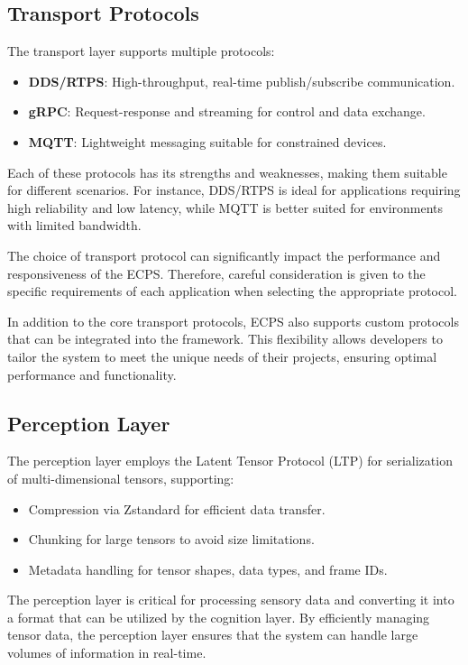 \documentclass[12pt]{article}
\begin{document}
\subsection{Transport Protocols}
The transport layer supports multiple protocols:
\begin{itemize}
  \item \textbf{DDS/RTPS}: High-throughput, real-time publish/subscribe communication.
  \item \textbf{gRPC}: Request-response and streaming for control and data exchange.
  \item \textbf{MQTT}: Lightweight messaging suitable for constrained devices.
\end{itemize}

Each of these protocols has its strengths and weaknesses, making them suitable for different scenarios. For instance, DDS/RTPS is ideal for applications requiring high reliability and low latency, while MQTT is better suited for environments with limited bandwidth.

The choice of transport protocol can significantly impact the performance and responsiveness of the ECPS. Therefore, careful consideration is given to the specific requirements of each application when selecting the appropriate protocol.

In addition to the core transport protocols, ECPS also supports custom protocols that can be integrated into the framework. This flexibility allows developers to tailor the system to meet the unique needs of their projects, ensuring optimal performance and functionality.

\subsection{Perception Layer}
The perception layer employs the Latent Tensor Protocol (LTP) for serialization of multi-dimensional tensors, supporting:
\begin{itemize}
  \item Compression via Zstandard for efficient data transfer.
  \item Chunking for large tensors to avoid size limitations.
  \item Metadata handling for tensor shapes, data types, and frame IDs.
\end{itemize}

The perception layer is critical for processing sensory data and converting it into a format that can be utilized by the cognition layer. By efficiently managing tensor data, the perception layer ensures that the system can handle large volumes of information in real-time.
\end{document}
